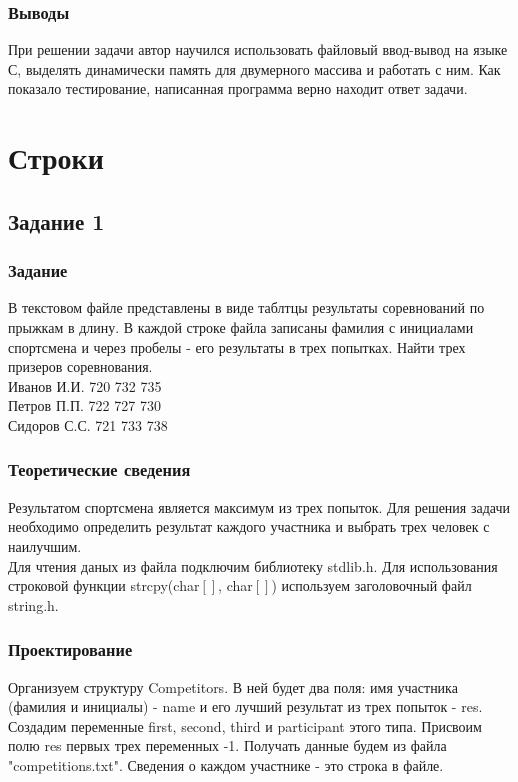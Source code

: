 \documentclass[12pt,a4paper]{report}
\begin{document}
\subsection{Выводы}
При решении задачи автор научился использовать файловый ввод-вывод на языке С, выделять динамически память для двумерного массива и работать с ним. Как показало тестирование, написанная программа верно находит ответ задачи. \\
\newpage

\chapter{Строки}
\section{Задание 1}
\subsection{Задание}
В текстовом файле представлены в виде таблтцы результаты соревнований по прыжкам в длину. В каждой строке файла записаны фамилия с инициалами спортсмена и через пробелы - его результаты в трех попытках. Найти трех призеров соревнования. \\
Иванов И.И. 720 732 735 \\
Петров П.П. 722 727 730 \\
Сидоров С.С. 721 733 738 \\
\subsection{Теоретические сведения}
Результатом спортсмена является максимум из трех попыток. Для решения задачи необходимо определить результат каждого участника и выбрать трех человек с наилучшим. \\
Для чтения даных из файла подключим библиотеку stdlib.h. Для использования строковой функции strcpy(char$[]$, char$[]$) используем заголовочный файл string.h. 
\subsection{Проектирование}
Организуем структуру Competitors. В ней будет два поля: имя участника (фамилия и инициалы) - name и его лучший результат из трех попыток - res. Создадим переменные first, second, third и participant этого типа. Присвоим полю res первых трех переменных -1. Получать данные будем из файла "competitions.txt". Сведения о каждом участнике - это строка в файле. \\
\end{document}

